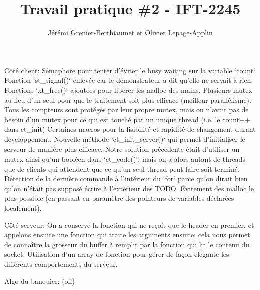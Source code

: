 \documentclass[11pt]{article}
\title{Travail pratique \#2 - IFT-2245}
\author{Jérémi Grenier-Berthiaumet et Olivier Lepage-Applin}
\begin{document}
\maketitle


Côté client:
Sémaphore pour tenter d'éviter le busy waiting sur la variable `count`.
Fonction `st_signal()` enlevée car le démonstrateur a dit qu'elle ne servait à rien.
Fonctions `xt_free()` ajoutées pour libérer les malloc des mains.
Plusieurs mutex au lieu d'un seul pour que le traitement soit plus efficace (meilleur parallélisme). Tous les compteurs sont protégés par leur propre mutex, mais on n'avait pas de besoin d'un mutex pour ce qui est touché par un unique thread (i.e. le count++ dans ct_init)
Certaines macros pour la lisibilité et rapidité de changement durant développement.
Nouvelle méthode `ct_init_server()` qui permet d'initialiser le serveur de manière plus efficace. Notre solution précédente était d'utiliser un mutex ainsi qu'un booléen dans `ct_code()`, mais on a alors autant de threads que de clients qui attendent que ce qu'un seul thread peut faire soit terminé.
Détection de la dernière commande à l'intérieur du `for` parce qu'on dirait bien qu'on n'était pas supposé écrire à l'extérieur des TODO.
Évitement des malloc le plus possible (en passant en paramètre des pointeurs de variables déclarées localement).



Côté serveur:
On a conservé la fonction qui ne reçoit que le header en premier, et appelons ensuite une fonction qui traite les arguments ensuite: cela nous permet de connaître la grosseur du buffer à remplir par la fonction qui lit le contenu du socket.
Utilisation d'un array de fonction pour gérer de façon élégante les différents comportements du serveur.



Algo du banquier:
(oli)
\end{document}
